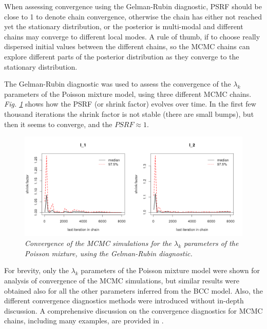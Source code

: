 When assessing convergence using the Gelman-Rubin diagnostic, PSRF should be close to 1 to denote chain convergence, otherwise the chain has either not reached yet the stationary distribution, or the posterior is multi-modal and different chains may converge to different local modes. A rule of thumb, if to choose really dispersed initial values between the different chains, so the MCMC chains can explore different parts of the posterior distribution as they converge to the stationary distribution.

The Gelman-Rubin diagnostic was used to assess the convergence of the $\lambda_{k}$ parameters of the Poisson mixture model, using three different MCMC chains. \emph{Fig. \ref{psrf-lambda-pic}} shows how the PSRF (or shrink factor) evolves over time. In the first few thousand iterations the shrink factor is not stable (\ie there are small bumps), but then it seems to converge, and the $PSRF \approx 1$.  
\begin{figure}[!ht]
\begin{center}
 \includegraphics[scale = 0.41]{images/psrf-l.png}
\caption{\emph{Convergence of the MCMC simulations for the $\lambda_{k}$ parameters of the Poisson mixture, using the Gelman-Rubin diagnostic.}}
\label{psrf-lambda-pic}
\end{center}
\end{figure}

For brevity, only the $\lambda_{k}$ parameters of the Poisson mixture model were shown for analysis of convergence of the MCMC simulations, but similar results were obtained also for all the other parameters inferred from the BCC model. Also, the different convergence diagnostics methods were introduced without in-depth discussion. A comprehensive discussion on the convergence diagnostics for MCMC chains, including many examples, are provided in \citep{Brooks1999, Robert2009}.